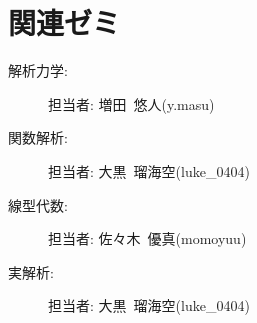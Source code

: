 \documentclass{ltjsarticle}
\begin{document}
    \section{関連ゼミ}
      \begin{description}
        \item[解析力学: ] 担当者: 増田\ 悠人(y.masu)
        \item[関数解析: ] 担当者: 大黒\ 瑠海空(luke\_0404)
        \item[線型代数: ] 担当者: 佐々木\ 優真(momoyuu)
        \item[実解析: ] 担当者: 大黒\ 瑠海空(luke\_0404)
      \end{description}
\end{document}

